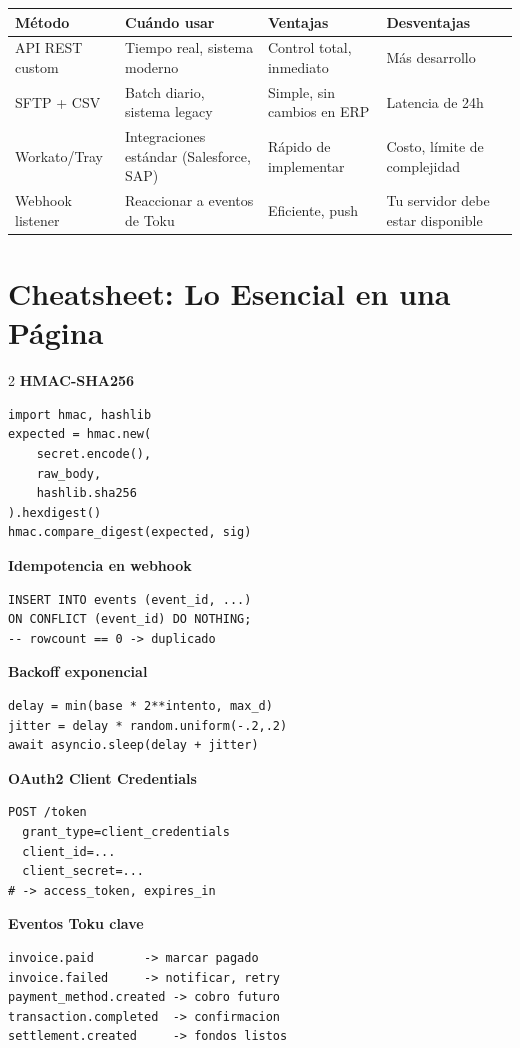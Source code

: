 \documentclass[11pt,a4paper]{article}
\begin{document}
\begin{center}
\begin{tabular}{p{3cm}p{4cm}p{4cm}p{3cm}}
\toprule
\textbf{Método} & \textbf{Cuándo usar} & \textbf{Ventajas} & \textbf{Desventajas} \\
\midrule
API REST custom & Tiempo real, sistema moderno & Control total, inmediato & Más desarrollo \\
SFTP + CSV & Batch diario, sistema legacy & Simple, sin cambios en ERP & Latencia de 24h \\
Workato/Tray & Integraciones estándar (Salesforce, SAP) & Rápido de implementar & Costo, límite de complejidad \\
Webhook listener & Reaccionar a eventos de Toku & Eficiente, push & Tu servidor debe estar disponible \\
\bottomrule
\end{tabular}
\end{center}

\section{Cheatsheet: Lo Esencial en una Página}

\begin{multicols}{2}
\textbf{\textcolor{hookpurple}{HMAC-SHA256}}
\begin{lstlisting}[style=python,numbers=none]
import hmac, hashlib
expected = hmac.new(
    secret.encode(),
    raw_body,
    hashlib.sha256
).hexdigest()
hmac.compare_digest(expected, sig)
\end{lstlisting}

\textbf{\textcolor{hookpurple}{Idempotencia en webhook}}
\begin{lstlisting}[style=python,numbers=none]
INSERT INTO events (event_id, ...)
ON CONFLICT (event_id) DO NOTHING;
-- rowcount == 0 -> duplicado
\end{lstlisting}

\textbf{\textcolor{hookpurple}{Backoff exponencial}}
\begin{lstlisting}[style=python,numbers=none]
delay = min(base * 2**intento, max_d)
jitter = delay * random.uniform(-.2,.2)
await asyncio.sleep(delay + jitter)
\end{lstlisting}

\columnbreak

\textbf{\textcolor{hookpurple}{OAuth2 Client Credentials}}
\begin{lstlisting}[style=python,numbers=none]
POST /token
  grant_type=client_credentials
  client_id=...
  client_secret=...
# -> access_token, expires_in
\end{lstlisting}

\textbf{\textcolor{hookpurple}{Eventos Toku clave}}
\begin{lstlisting}[style=python,numbers=none]
invoice.paid       -> marcar pagado
invoice.failed     -> notificar, retry
payment_method.created -> cobro futuro
transaction.completed  -> confirmacion
settlement.created     -> fondos listos
\end{lstlisting}
\end{multicols}
\end{document}
